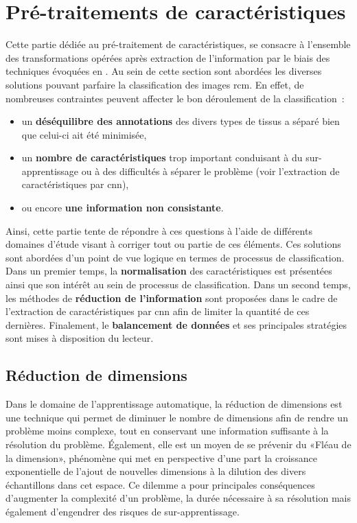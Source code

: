 \clearpage


\section{Pré-traitements de caractéristiques}
Cette partie dédiée au pré-traitement de caractéristiques, se consacre à l'ensemble des transformations opérées après extraction de l'information par le biais des techniques évoquées en . Au sein de cette section sont abordées les diverses solutions pouvant parfaire la classification des images \gls{rcm}. En effet, de nombreuses contraintes peuvent affecter le bon déroulement de la classification~:
\begin{itemize}
    \item un \textbf{déséquilibre des annotations} des divers types de tissus a séparé bien que celui-ci ait été minimisée,
    \item un \textbf{nombre de caractéristiques} trop important conduisant à du sur-apprentissage ou à des difficultés à séparer le problème (voir l'extraction de caractéristiques par \gls{cnn}),
    \item ou encore \textbf{une information non consistante}.
\end{itemize}\par

Ainsi, cette partie tente de répondre à ces questions à l'aide de différents domaines d'étude visant à corriger tout ou partie de ces éléments. Ces solutions sont abordées d'un point de vue logique en termes de processus de classification. Dans un premier temps, la \textbf{normalisation} des caractéristiques est présentées ainsi que son intérêt au sein de processus de classification. Dans un second temps, les méthodes de \textbf{réduction de l'information} sont proposées dans le cadre de l'extraction de caractéristiques par \gls{cnn} afin de limiter la quantité de ces dernières. Finalement, le \textbf{balancement de données} et ses principales stratégies sont mises à disposition du lecteur.

\subsection{Réduction de dimensions}
Dans le domaine de l'apprentissage automatique, la réduction de dimensions est une technique qui permet de diminuer le nombre de dimensions afin de rendre un problème moins complexe, tout en conservant une information suffisante à la résolution du problème. Également, elle est un moyen de se prévenir du «Fléau de la dimension», phénomène qui met en perspective d'une part la croissance exponentielle de l'ajout de nouvelles dimensions à la dilution des divers échantillons dans cet espace. Ce dilemme a pour principales conséquences d'augmenter la complexité d'un problème, la durée nécessaire à sa résolution mais également d'engendrer des risques de sur-apprentissage.\par

